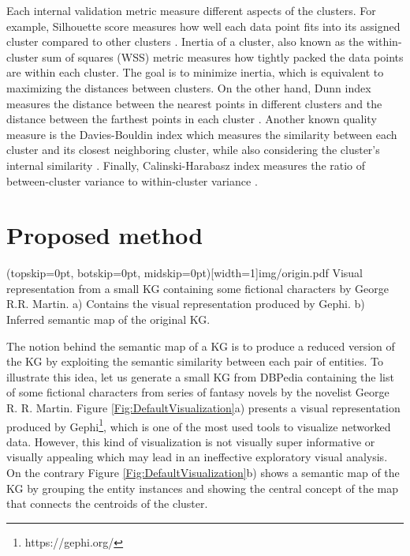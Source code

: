 \documentclass{ieeeaccess}
\begin{document}
Each internal validation metric measure different aspects
of the clusters. For example, Silhouette score measures
how well each data point fits into its assigned cluster 
compared to other clusters \cite{kaufmanPAM}. Inertia of 
a cluster, also known as the within-cluster sum of squares
(WSS) metric measures how tightly packed the data points
are within each cluster. The goal is to minimize inertia, 
which is equivalent to maximizing the distances between
clusters. On the other hand, Dunn index measures the distance between the nearest points in different clusters and the
distance between the farthest points in each cluster 
\cite{dunn1974well}. Another known quality measure is 
the Davies-Bouldin index which measures the similarity 
between each cluster and its closest neighboring cluster,
while also considering the cluster's internal similarity 
\cite{davies1979cluster}. Finally, Calinski-Harabasz 
index measures the ratio of between-cluster variance 
to within-cluster variance \cite{calinski1974dendrite}.

\section{Proposed method}
\label{sec:Method}

\Figure[h!](topskip=0pt, botskip=0pt, midskip=0pt)[width=1\textwidth]{img/origin.pdf}
{Visual representation from a small KG containing some fictional characters by George R.R. Martin. a) Contains the visual representation produced by Gephi. b) Inferred semantic map of the original KG.\label{Fig:DefaultVisualization}}

The notion behind the semantic map of a KG is to produce 
a reduced version of the KG by exploiting the semantic 
similarity between each pair of entities. To illustrate 
this idea, let us generate a small KG from DBPedia containing 
the list of some fictional characters from series of fantasy novels 
by the novelist George R. R. Martin. Figure \ref{Fig:DefaultVisualization}a) 
presents a visual representation produced by Gephi\footnote{https://gephi.org/}, 
which is one of the most used tools to visualize networked data. However, 
this kind of visualization is not visually super informative 
or visually appealing which may lead in an ineffective
exploratory visual analysis. On the contrary Figure \ref{Fig:DefaultVisualization}b)
shows a semantic map of the KG by grouping the entity instances
and showing the central concept of the map that connects the centroids of
the cluster.
\end{document}
